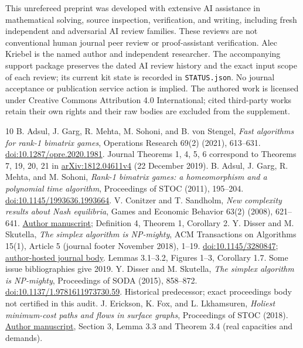 \documentclass[11pt]{article}
\theoremstyle{remark}\newtheorem{remark}[theorem]{Remark}
\begin{document}
This unrefereed preprint was developed with extensive AI assistance in mathematical solving, source inspection, verification, and writing, including fresh independent and adversarial AI review families. These reviews are not conventional human journal peer review or proof-assistant verification. Alec Kriebel is the named author and independent researcher. The accompanying support package preserves the dated AI review history and the exact input scope of each review; its current kit state is recorded in \texttt{STATUS.json}. No journal acceptance or publication service action is implied. The authored work is licensed under Creative Commons Attribution 4.0 International; cited third-party works retain their own rights and their raw bodies are excluded from the supplement.

\begin{thebibliography}{10}\small
{} B. Adsul, J. Garg, R. Mehta, M. Sohoni, and B. von Stengel, \emph{Fast algorithms for rank-1 bimatrix games}, Operations Research 69(2) (2021), 613--631. \href{https://doi.org/10.1287/opre.2020.1981}{doi:10.1287/opre.2020.1981}. Journal Theorems 1, 4, 5, 6 correspond to Theorems 7, 19, 20, 21 in \href{https://arxiv.org/abs/1812.04611}{arXiv:1812.04611v4} (22 December 2019).
 B. Adsul, J. Garg, R. Mehta, and M. Sohoni, \emph{Rank-1 bimatrix games: a homeomorphism and a polynomial time algorithm}, Proceedings of STOC (2011), 195--204. \href{https://doi.org/10.1145/1993636.1993664}{doi:10.1145/1993636.1993664}.
 V. Conitzer and T. Sandholm, \emph{New complexity results about Nash equilibria}, Games and Economic Behavior 63(2) (2008), 621--641. \href{https://www.cs.cmu.edu/~conitzer/nashGEB08.pdf}{Author manuscript}; Definition 4, Theorem 1, Corollary 2.
 Y. Disser and M. Skutella, \emph{The simplex algorithm is NP-mighty}, ACM Transactions on Algorithms 15(1), Article 5 (journal footer November 2018), 1--19. \href{https://doi.org/10.1145/3280847}{doi:10.1145/3280847}; \href{https://www2.mathematik.tu-darmstadt.de/~disser/pdfs/DisserSkutella18.pdf}{author-hosted journal body}. Lemmas 3.1--3.2, Figures 1--3, Corollary 1.7. Some issue bibliographies give 2019.
 Y. Disser and M. Skutella, \emph{The simplex algorithm is NP-mighty}, Proceedings of SODA (2015), 858--872. \href{https://doi.org/10.1137/1.9781611973730.59}{doi:10.1137/1.9781611973730.59}. Historical predecessor; exact proceedings body not certified in this audit.
 J. Erickson, K. Fox, and L. Lkhamsuren, \emph{Holiest minimum-cost paths and flows in surface graphs}, Proceedings of STOC (2018). \href{https://jeffe.cs.illinois.edu/pubs/pdf/holiestx.pdf}{Author manuscript}, Section 3, Lemma 3.3 and Theorem 3.4 (real capacities and demands).

\end{thebibliography}
\end{document}
